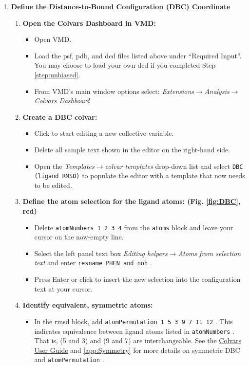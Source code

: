 \documentclass[9pt,tutorial]{Styling/livecoms}
\newcommand{\button}[1]{
  \inlineBox[gray]{\texttt{#1}}
}
\newcommand{\menu}[1]{
  \textit{#1}
}
\newcommand{\option}[1]{
  \texttt{#1}
}
\newcommand{\textInput}[1]{
  \texttt{#1}
}
\begin{document}
\begin{enumerate}
    \item \textbf{Define the Distance-to-Bound Configuration (DBC) Coordinate}
        \begin{enumerate}[label=\alph*., ref=\theenumi.\alph*]
             \item \textbf{Open the Colvars Dashboard in VMD:}
             \begin{itemize}
                \item Open VMD.
                 \item Load the psf, pdb, and dcd files listed above under ``Required Input''. You may choose to load your own dcd if you completed Step \ref{step:unbiased}.
                 \item From VMD's main window options select: \menu{Extensions$\rightarrow$Analysis$\rightarrow$Colvars Dashboard}
             \end{itemize}
             \item \textbf{Create a DBC colvar:}
             \begin{itemize}
                 \item Click \button{New [Ctrl-n]} to start editing a new collective variable.
                \item Delete all sample text shown in the editor on the right-hand side.
                \item Open the \menu{Templates$\rightarrow$colvar templates} drop-down list and select \option{DBC (ligand RMSD)} to populate the editor with a template that now needs to be edited.
            \end{itemize}
             \item \label{step:ligNumbers}\textbf{Define the atom selection for the ligand atoms: (Fig. \ref{fig:DBC}, red)} 
             \begin{itemize}
                 \item Delete  \textInput{atomNumbers 1 2 3 4} from the \textInput{atoms} block and leave your cursor on the now-empty line.
                 \item Select the left panel text box \menu{Editing helpers$\rightarrow$Atoms from selection text} and enter \textInput{resname PHEN and noh}.
                 \item Press Enter or click \button{Insert [Enter]} to insert the new selection into the configuration text at your cursor.
            \end{itemize}
            \item \label{step:symmetry}\textbf{Identify equivalent, symmetric atoms:}
             \begin{itemize}
                 \item In the rmsd block, add \textInput{atomPermutation 1 5 3 9 7 11 12}. 
                 This indicates equivalence between ligand atoms listed in \textInput{atomNumbers}. That is, (5 and 3) and (9 and 7) are interchangeable. See the \href{https://colvars.github.io/colvars-refman-vmd/colvars-refman-vmd.html#sec:cvc_rmsd}{Colvars User Guide} and \ref{app:Symmetry} for more details on symmetric DBC and \textInput{atomPermutation}.
            \end{itemize}


\end{enumerate}
\end{enumerate}
\end{document}
